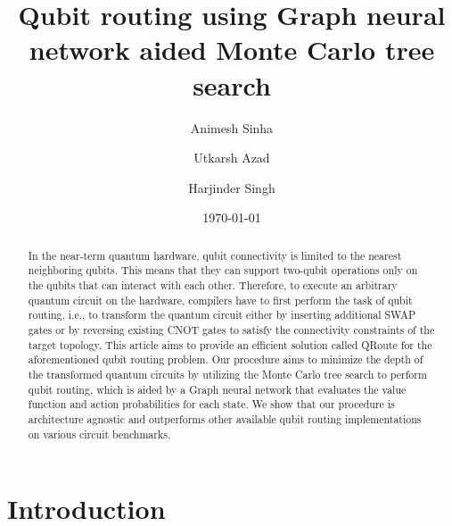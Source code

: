 \documentclass[%
 reprint,
 longbibliography,
 amsmath,amssymb,
 aps,
]{revtex4-2}
\begin{document}

\title{Qubit routing using Graph neural network aided Monte Carlo tree search}

\author{Animesh Sinha}
\author{Utkarsh Azad}
\author{Harjinder Singh}

%

\date{\today}%

\begin{abstract}
In the near-term quantum hardware, qubit connectivity is limited to the nearest neighboring qubits. This means that they can support two-qubit operations only on the qubits that can interact with each other. Therefore, to execute an arbitrary quantum circuit on the hardware, compilers have to first perform the task of qubit routing, i.e., to transform the quantum circuit either by inserting additional SWAP gates or by reversing existing CNOT gates to satisfy the connectivity constraints of the target topology. This article aims to provide an efficient solution called QRoute for the aforementioned qubit routing problem. Our procedure aims to minimize the depth of the transformed quantum circuits by utilizing the Monte Carlo tree search to perform qubit routing, which is aided by a Graph neural network that evaluates the value function and action probabilities for each state. We show that our procedure is architecture agnostic and outperforms other available qubit routing implementations on various circuit benchmarks.
\end{abstract}

\maketitle


\section{\label{sec:intro}Introduction}
\end{document}
